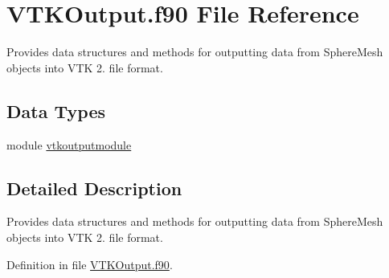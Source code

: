 \hypertarget{_v_t_k_output_8f90}{\section{V\+T\+K\+Output.\+f90 File Reference}
\label{_v_t_k_output_8f90}
}


Provides data structures and methods for outputting data from Sphere\+Mesh objects into V\+T\+K 2. file format.  


\subsection*{Data Types}
\begin{DoxyCompactItemize}
\item 
module \hyperlink{classvtkoutputmodule}{vtkoutputmodule}
\end{DoxyCompactItemize}


\subsection{Detailed Description}
Provides data structures and methods for outputting data from Sphere\+Mesh objects into V\+T\+K 2. file format. 



Definition in file \hyperlink{_v_t_k_output_8f90_source}{V\+T\+K\+Output.\+f90}.

